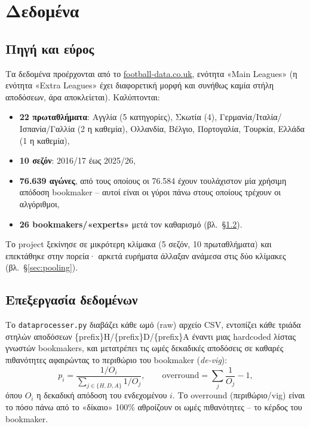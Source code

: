 \documentclass[11pt,a4paper]{article}
\newcommand{\file}[1]{\texttt{#1}}
\renewcommand{\_}{\oldunderscore\allowbreak}
\begin{document}
\section{Δεδομένα}

\subsection{Πηγή και εύρος}

Τα δεδομένα προέρχονται από το \url{football-data.co.uk}, ενότητα «Main Leagues» (η
ενότητα «Extra Leagues» έχει διαφορετική μορφή και συνήθως καμία στήλη αποδόσεων, άρα
αποκλείεται). Καλύπτονται:
\begin{itemize}
  \item \textbf{22 πρωταθλήματα}: Αγγλία (5 κατηγορίες), Σκωτία (4), Γερμανία/Ιταλία/
        Ισπανία/Γαλλία (2 η καθεμία), Ολλανδία, Βέλγιο, Πορτογαλία, Τουρκία, Ελλάδα
        (1 η καθεμία),
  \item \textbf{10 σεζόν}: 2016/17 έως 2025/26,
  \item \textbf{76.639 αγώνες}, από τους οποίους οι 76.584 έχουν τουλάχιστον μία χρήσιμη
        απόδοση bookmaker -- αυτοί είναι οι γύροι πάνω στους οποίους τρέχουν οι αλγόριθμοι,
  \item \textbf{26 bookmakers/«experts»} μετά τον καθαρισμό (βλ.~\S\ref{sec:dataproc}).
\end{itemize}

Το project ξεκίνησε σε μικρότερη κλίμακα (5 σεζόν, 10 πρωταθλήματα) και επεκτάθηκε στην
πορεία· αρκετά ευρήματα άλλαξαν ανάμεσα στις δύο κλίμακες (βλ.~\S\ref{sec:pooling}).

\subsection{Επεξεργασία δεδομένων}
\label{sec:dataproc}

Το \file{data\_processer.py} διαβάζει κάθε ωμό (raw) αρχείο CSV, εντοπίζει κάθε τριάδα
στηλών αποδόσεων \{prefix\}H/\{prefix\}D/\{prefix\}A έναντι μιας hardcoded λίστας γνωστών
bookmakers, και μετατρέπει τις ωμές δεκαδικές αποδόσεις σε καθαρές
πιθανότητες αφαιρώντας το περιθώριο του bookmaker (\emph{de-vig}):
\begin{equation}
  p_i = \frac{1/O_i}{\sum_{j\in\{H,D,A\}} 1/O_j}, \qquad
  \text{overround} = \sum_{j} \frac{1}{O_j} - 1,
\end{equation}
όπου $O_i$ η δεκαδική απόδοση του ενδεχομένου $i$. Το overround (περιθώριο/vig) είναι το
πόσο πάνω από το «δίκαιο» 100\% αθροίζουν οι ωμές πιθανότητες -- το κέρδος του bookmaker.
\end{document}
